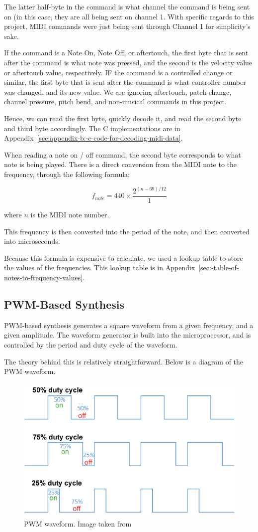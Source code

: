 The latter half-byte in the command is what channel the command is being sent on (in this case, they are all being sent on channel 1. 
With specific regards to this project, MIDI commands were just being sent through Channel 1 for simplicity's sake. 

If the command is a Note On, Note Off, or aftertouch, the first byte that is sent after the command is what note was pressed, and the second is the velocity value or aftertouch value, respectively. IF the command is a controlled change or similar, the first byte that is sent after the command is what controller number was changed, and its new value. We are ignoring aftertouch, patch change, channel pressure, pitch bend, and non-musical commands in this project. 

Hence, we can read the first byte, quickly decode it, and read the second byte and third byte accordingly.
The C implementations are in Appendix~\ref{sec:appendix-b:-c-code-for-decoding-midi-data}.

When reading a note on / off command, the second byte corresponds to what note is being played.
There is a direct conversion from the MIDI note to the frequency, through the following formula:

\[
f_{note}=440\times\frac{2^{(n-69)/12}}{1}
\]

where $n$ is the MIDI note number.

This frequency is then converted into the period of the note, and then converted into microseconds.

Because this formula is expensive to calculate, we used a lookup table to store the values of the frequencies.
This lookup table is in Appendix~\ref{sec:-table-of-notes-to-frequency-values}.

\subsection{PWM-Based Synthesis}\label{subsec:pwm-based-synthesis-theory}

PWM-based synthesis generates a square waveform from a given frequency, and a given amplitude.
The waveform generator is built into the microprocessor, and is controlled by the period and duty cycle of the waveform.

The theory behind this is relatively straightforward.
Below is a diagram of the PWM waveform.

\begin{figure}[H]
    \centering
    \includegraphics[width = 0.5 \textwidth]{pwmwaveform}
    \caption{PWM waveform. Image taken from} %
    \label{fig:pwmwaveform}
\end{figure}

